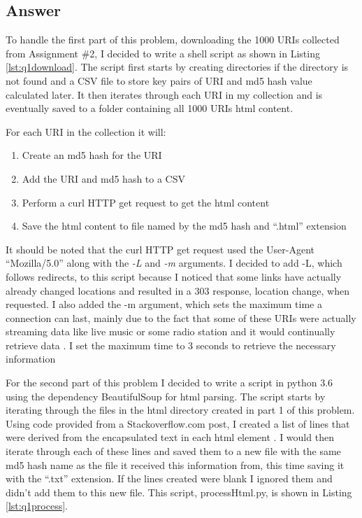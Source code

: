 \documentclass[letterpaper,11pt]{article}
\newcommand*{\srcPath}{../src}%
\begin{document}
\subsection*{Answer}

To handle the first part of this problem, downloading the 1000 URIs collected from Assignment \#2, I decided to write a shell script as shown in Listing \ref{lst:q1download}. The script first starts by creating directories if the directory is not found and a CSV file to store key pairs of URI and md5 hash value calculated later. It then iterates through each URI in my collection and is eventually saved to a folder containing all 1000 URIs html content. 

For each URI in the collection it will: 
\begin{enumerate}
    \item Create an md5 hash for the URI
    \item Add the URI and md5 hash to a CSV
    \item Perform a curl HTTP get request to get the html content
    \item Save the html content to file named by the md5 hash and ``.html'' extension
\end{enumerate}

It should be noted that the curl HTTP get request used the User-Agent ``Mozilla/5.0'' along with the \emph{-L} and \emph{-m} arguments. I decided to add -L, which follows redirects, to this script because I noticed that some links have actually already changed locations and resulted in a 303 response, location change, when requested. I also added the -m argument, which sets the maximum time a connection can last, mainly due to the fact that some of these URIs were actually streaming data like live music or some radio station and it would continually retrieve data \cite{curlref}. I set the maximum time to 3 seconds to retrieve the necessary information



For the second part of this problem I decided to write a script in python 3.6 using the dependency BeautifulSoup for html parsing. The script starts by iterating through the files in the html directory created in part 1 of this problem. Using code provided from a Stackoverflow.com post, I created a list of lines that were derived from the encapsulated text in each html element \cite{}. I would then iterate through each of these lines and saved them to a new file with the same md5 hash name as the file it received this information from, this time saving it with the ``.txt'' extension. If the lines created were blank I ignored them and didn't add them to this new file. This script, processHtml.py, is shown in Listing \ref{lst:q1process}.
\end{document}
